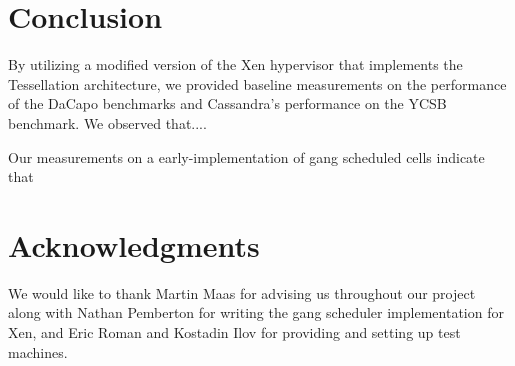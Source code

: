 \documentclass{sig-alternate}
\begin{document}
\section{Conclusion} \label{sec:conclusion}
By utilizing a modified version of the Xen hypervisor that implements the Tessellation architecture, we provided baseline measurements on the performance of the DaCapo benchmarks and Cassandra's performance on the YCSB benchmark. We observed that....

Our measurements on a early-implementation of gang scheduled cells indicate that

\section{Acknowledgments}
We would like to thank Martin Maas for advising us throughout our project along with Nathan Pemberton for writing the gang scheduler implementation for Xen, and Eric Roman and Kostadin Ilov for providing and setting up test machines.


%
%

\balancecolumns
\end{document}
